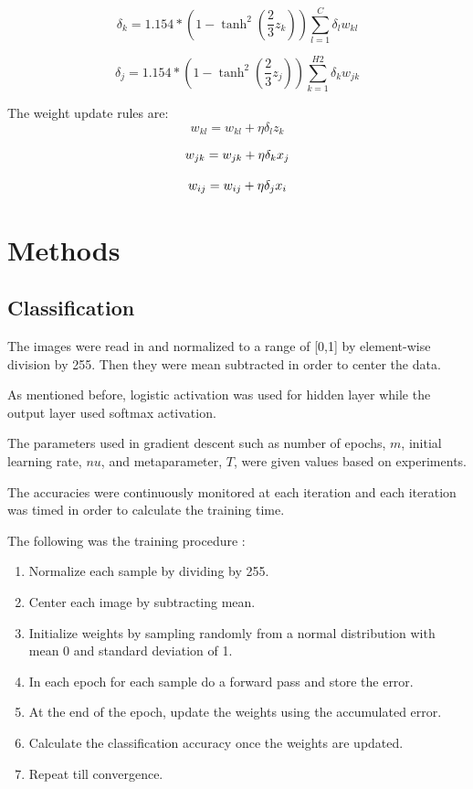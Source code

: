 \documentclass[11pt,twoside]{article}
\begin{document}
\begin{equation}
\delta_{k} = 1.154*(1 - \tanh^{2}(\frac{2}{3}z_{k})) \sum_{l = 1}^{C} \delta_{l} w_{kl}
\end{equation}

\begin{equation}
\delta_{j} = 1.154*(1 - \tanh^{2}(\frac{2}{3}z_{j})) \sum_{k = 1}^{H2} \delta_{k} w_{jk}
\end{equation}

The weight update rules are:\\
\begin{equation}
w_{kl} = w_{kl} + \eta\delta_{l}z_{k}
\end{equation}

\begin{equation}
w_{jk} = w_{jk} + \eta\delta_{k}x_{j}\\
\end{equation}

\begin{equation}
w_{ij} = w_{ij} + \eta\delta_{j}x_{i}\\
\end{equation}
\section{Methods}

\subsection{Classification}

The images were read in and normalized to a range of [0,1] by element-wise division by 255. Then they were mean subtracted in order to center the data.

As mentioned before, logistic activation was used for hidden layer while the output layer used softmax activation.

The parameters used in gradient descent such as number of epochs, $m$, initial learning rate, $nu$, and metaparameter, $T$, were given values based on experiments.

The accuracies were continuously monitored at each iteration and each iteration was timed in order to calculate the training time.

The following was the training procedure :

\begin{enumerate}
\item Normalize each sample by dividing by 255.
\item Center each image by subtracting mean.
\item Initialize weights by sampling randomly from a normal distribution with mean 0 and standard deviation of 1.
\item In each epoch for each sample do a forward pass and store the error.
\item At the end of the epoch, update the weights using the accumulated error.
\item Calculate the classification accuracy once the weights are updated.
\item Repeat till convergence.
\end{enumerate}
\end{document}
